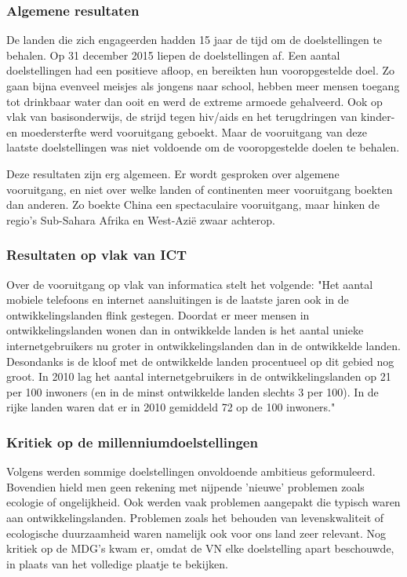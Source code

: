 \subsubsection{Algemene resultaten}
De landen die zich engageerden hadden 15 jaar de tijd om de doelstellingen te behalen. Op 31 december 2015 liepen de doelstellingen af.
Een aantal doelstellingen had een positieve afloop, en bereikten hun vooropgestelde doel. Zo gaan bijna evenveel meisjes als jongens naar school, hebben meer mensen toegang tot drinkbaar water dan ooit en werd de extreme armoede gehalveerd. Ook op vlak van basisonderwijs, de strijd tegen hiv/aids en het terugdringen van kinder- en moedersterfte werd vooruitgang geboekt. Maar de vooruitgang van deze laatste doelstellingen was niet voldoende om de vooropgestelde doelen te behalen. \autocite{Tierens2014}

Deze resultaten zijn erg algemeen. Er wordt gesproken over algemene vooruitgang, en niet over welke landen of continenten meer vooruitgang boekten dan anderen. Zo boekte China een spectaculaire vooruitgang, maar hinken de regio's Sub-Sahara Afrika en West-Azië zwaar achterop. \autocite{Tierens2014}
 
 \subsubsection{Resultaten op vlak van ICT}
Over de vooruitgang op vlak van informatica stelt \autocite{Kampherbeek2012} het volgende: "Het aantal mobiele telefoons en internet aansluitingen is de laatste jaren ook in de ontwikkelingslanden flink gestegen. Doordat er meer mensen in ontwikkelingslanden wonen dan in ontwikkelde landen is het aantal unieke internetgebruikers nu groter in ontwikkelingslanden dan in de ontwikkelde landen. Desondanks is de kloof met de ontwikkelde landen procentueel op dit gebied nog groot. In 2010 lag het aantal internetgebruikers in de ontwikkelingslanden op 21 per 100 inwoners (en in de minst ontwikkelde landen slechts 3 per 100). In de rijke landen waren dat er in 2010 gemiddeld 72 op de 100 inwoners."
 
 \subsubsection{Kritiek op de millenniumdoelstellingen}
 Volgens  \autocite{VN2015} werden sommige doelstellingen onvoldoende ambitieus geformuleerd. Bovendien hield men geen rekening met nijpende 'nieuwe' problemen zoals ecologie of ongelijkheid. Ook werden vaak problemen aangepakt die typisch waren aan ontwikkelingslanden. Problemen zoals het behouden van levenskwaliteit of ecologische duurzaamheid waren namelijk ook voor ons land zeer relevant. Nog kritiek op de MDG's kwam er, omdat de VN elke doelstelling apart beschouwde, in plaats van het volledige plaatje te bekijken. \autocite{VN2015}

